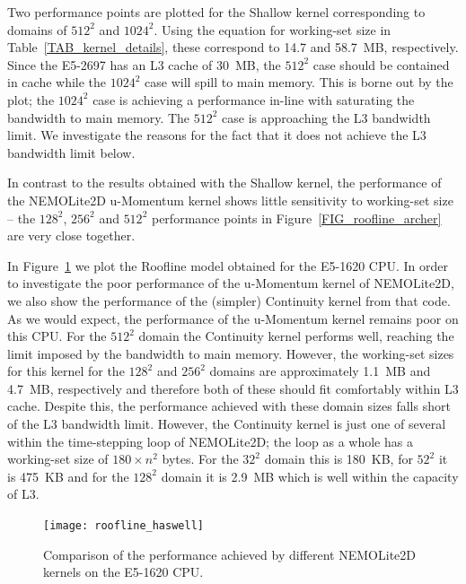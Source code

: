 \documentclass[12pt]{article}
\begin{document}
Two performance points are plotted for the Shallow kernel
corresponding to domains of $512^2$ and $1024^2$. Using the equation
for working-set size in Table~\ref{TAB_kernel_details}, these
correspond to 14.7 and 58.7~MB, respectively. Since the E5-2697 has
an L3 cache of 30~MB, the $512^2$ case should be contained in cache
while the $1024^2$ case will spill to main memory. This is borne out
by the plot; the $1024^2$ case is achieving a performance in-line
with saturating the bandwidth to main memory. The $512^2$ case is
approaching the L3 bandwidth limit. We investigate the reasons for
the fact that it does not achieve the L3 bandwidth limit below.
 
In contrast to the results obtained with the Shallow kernel, the
performance of the NEMOLite2D u-Momentum kernel shows little
sensitivity to working-set size -- the $128^2$, $256^2$ and $512^2$
performance points in Figure~\ref{FIG_roofline_archer} are very close
together.

In Figure~\ref{FIG_roofline_haswell} we plot the Roofline model
obtained for the E5-1620 CPU. In order to investigate the poor
performance of the u-Momentum kernel of NEMOLite2D, we also show the
performance of the (simpler) Continuity kernel from that code. As we
would expect, the performance of the u-Momentum kernel remains poor on
this CPU. For the $512^2$ domain the Continuity kernel performs well,
reaching the limit imposed by the bandwidth to main memory. However,
the working-set sizes for this kernel for the $128^2$ and $256^2$
domains are approximately 1.1~MB and 4.7~MB, respectively and
therefore both of these should fit comfortably within L3
cache. Despite this, the performance achieved with these domain sizes
falls short of the L3 bandwidth limit.  However, the Continuity kernel is just
one of several within the time-stepping loop of NEMOLite2D; the loop
as a whole has a working-set size of $180\times n^{2}$ bytes. For the
$32^2$ domain this is 180~KB, for $52^2$ it is 475~KB and for the
$128^2$ domain it is 2.9~MB which is well within the capacity of L3.

\begin{figure}
\centering
\texttt{[image: roofline\_haswell]}
\caption{Comparison of the performance achieved by different
  NEMOLite2D kernels on the E5-1620 CPU.}
\label{FIG_roofline_haswell}
\end{figure}
\end{document}
